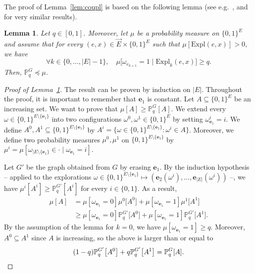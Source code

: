 \documentclass[10pt]{amsart}
\newtheorem{lemm}[theo]{Lemma}
\theoremstyle{definition}
\newcommand{\Pro}{\mathbb{P}}
\newcommand{\ee}{\mathbf{e}}
\newcommand{\Expl}{\mathrm{Expl}}
\let\oldforall\forall
\renewcommand*{\forall}{\mathrel{\oldforall}}
\begin{document}
The proof of Lemma~\ref{lem:coupl} is based on the following lemma (see e.g.~\cite[Lemma~1]{Rus82}, \cite[(7.64)]{Gri99} and~\cite[Lemma~2.1]{DRT19} for very similar results).

\begin{lemm}\label{lem:gen}
Let $q \in [0,1]$. Moreover, let $\mu$ be a probability measure on $\{0,1\}^E$ and assume that for every $(e,x) \in \vec{E}\times\{0,1\}^E$ such that $\mu[\Expl(e,x)]>0$, we have
\[
\forall k \in \{0,\dots,|E|-1\}, \quad \mu \big[\omega_{e_{k+1}} = 1 \; \big| \; \Expl_k(e,x) \big] \ge q.
\]
Then, $\Pro_q^G \preceq \mu$.
\end{lemm}

\begin{proof}[Proof of Lemma~\ref{lem:gen}]
The result can be proven by induction on $|E|$. Throughout the proof, it is important to remember that $\ee_1$ is constant. Let $A\subseteq\{0,1\}^E$ be an increasing set. We want to prove that $\mu[A]\ge\Pro^G_q[A]$. We extend every $\omega \in \{0,1\}^{E\setminus\{\ee_1\}}$ into two configurations $\omega^0,\omega^1\in\{0,1\}^E$ by setting $\omega^i_{\ee_1}=i$. We define $A^0,A^1\subseteq\{0,1\}^{E\setminus\{\ee_1\}}$ by $A^i=\{\omega \in \{0,1\}^{E\setminus\{\ee_1\}} : \omega^i \in A\}$. Moreover, we define two probability measures $\mu^0,\mu^1$ on $\{0,1\}^{E\setminus\{\ee_1\}}$ by $\mu^i=\mu[\omega_{|E\setminus\{\ee_1\}}\in\cdot\mid\omega_{\ee_1}=i]$.


Let $G'$ be the graph obtained from $G$ by erasing $\ee_1$. By the induction hypothesis -- applied to the explorations $\omega\in\{0,1\}^{E\setminus\{\ee_1\}}\mapsto(\ee_2(\omega^i),\dots,\ee_{|E|}(\omega^i))$ --, we have $\mu^i[A^i]\ge \Pro^{G'}_q[A^i]$ for every $i\in \{0,1\}$. As a result,
\begin{align*}
\mu[A] &=\mu[\omega_{\ee_1}=0]\mu^0\big[A^0\big]+ \mu[\omega_{\ee_1}=1]\mu^1\big[A^1\big]\\
&\ge \mu[\omega_{\ee_1}=0]\Pro_q^{G'} \big[A^0\big]+ \mu[\omega_{\ee_1}=1]\Pro_q^{G'} \big[A^1\big].
\end{align*}
By the assumption of the lemma for $k=0$, we have $ \mu[\omega_{\ee_1}=1] \ge q$. Moreover, $A^0\subseteq A^1$ since $A$ is increasing, so the above is larger than or equal to
\[
(1-q)\Pro_q^{G'} \big[A^0\big]+q \Pro_q^{G'} \big[A^1\big] = \Pro^G_q[A]. \qedhere
\]
\end{proof}
\end{document}
